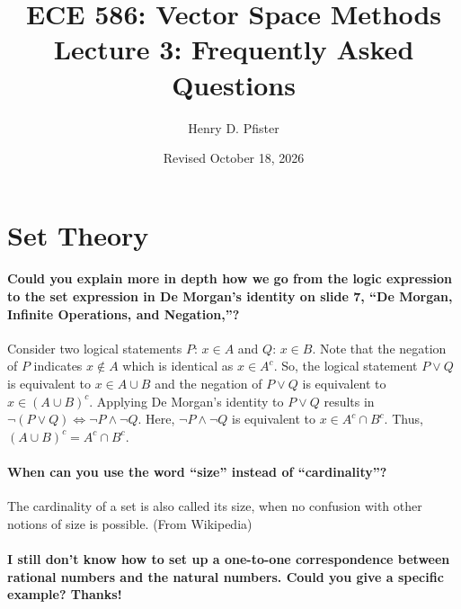 \documentclass[10pt,english]{article}
\begin{document}
\title{ECE 586: Vector Space Methods \\ Lecture 3: Frequently Asked Questions}
\author{Henry D. Pfister \\ \univ}
\date{Revised October 18, 2026}

\maketitle


\section{Set Theory}

\paragraph{Could you explain more in depth how we go from the logic expression to the set expression in De Morgan's identity on slide 7, ``De Morgan, Infinite Operations, and Negation,''?}

Consider two logical statements $P$: $x \in A$ and $Q$: $x \in B$. Note that the negation of $P$ indicates $x \notin A$ which is identical as $x \in A^c$. So, the logical statement $P \vee Q$ is equivalent to $x \in A \cup B$ and the negation of $P \vee Q$ is equivalent to $x \in (A \cup B)^c$. Applying De Morgan's identity to $P \vee Q$ results in $\neg (P \vee Q) \Leftrightarrow \neg P \wedge \neg Q$. Here, $\neg P \wedge \neg Q$ is equivalent to $x \in A^c \cap B^c$. Thus, $(A \cup B)^c = A^c \cap B^c$.

\paragraph{When can you use the word ``size'' instead of ``cardinality''?}

The cardinality of a set is also called its size, when no confusion with other notions of size is possible. (From Wikipedia)

\paragraph{I still don't know how to set up a one-to-one correspondence between rational numbers and the natural numbers. Could you give a specific example? Thanks!}
\end{document}
